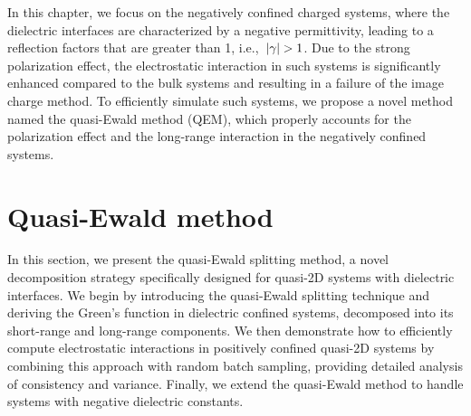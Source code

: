 In this chapter, we focus on the negatively confined charged systems, where the dielectric interfaces are characterized by a negative permittivity, leading to a reflection factors that are greater than 1, i.e.,~$\lvert\gamma\rvert > 1$.
Due to the strong polarization effect, the electrostatic interaction in such systems is significantly enhanced compared to the bulk systems and resulting in a failure of the image charge method.
To efficiently simulate such systems, we propose a novel method named the quasi-Ewald method (QEM), which properly accounts for the polarization effect and the long-range interaction in the negatively confined systems.

\section{Quasi-Ewald method}

In this section, we present the quasi-Ewald splitting method, a novel decomposition strategy specifically designed for quasi-2D systems with dielectric interfaces. 
We begin by introducing the quasi-Ewald splitting technique and deriving the Green's function in dielectric confined systems, decomposed into its short-range and long-range components.
We then demonstrate how to efficiently compute electrostatic interactions in positively confined quasi-2D systems by combining this approach with random batch sampling, providing detailed analysis of consistency and variance.
Finally, we extend the quasi-Ewald method to handle systems with negative dielectric constants.

